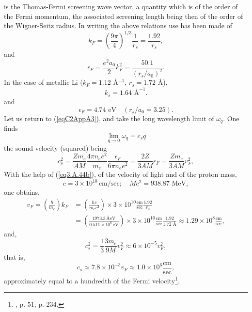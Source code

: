 is the Thomas-Fermi screening wave vector, a quantity which is of the order of the Fermi momentum, the associated screening length being then of the order of the Wigner-Seitz radius. In writing the above relations use has been made of
\begin{equation}\label{eq3.A.44b}
k_F=\left(\frac{9\pi}{4}\right)^{1/3}\frac{1}{r_s}=\frac{1.92}{r_s},
\end{equation}
and
\begin{equation}\label{eq3.A.44}
\epsilon_F=\frac{e^2a_0}{2}k_F^2=\frac{50.1}{(r_s/a_0)^2}.
\end{equation}
 In the case of metallic Li ($k_F=1.12$ \AA$^{-1}$, $r_s=1.72$ \AA),
\begin{equation}\label{eq3.A.45}
k_s=1.64\text{ \AA}^{-1}.
\end{equation}
and
\begin{equation}\label{eq4.8.46}
\epsilon_F=4.74\text{ eV}\quad(r_s/a_0=3.25).
\end{equation}
 Let us return to (\ref{eqC2AppA3}), and take the long wavelength limit of $\omega_q$. One finds
\begin{equation}\label{eq3.A.46}
\lim_{q\to0}\omega_q=c_sq
\end{equation}
 the sound velocity (squared) being 
\begin{equation}\label{eqC2AppA8}
c_s^2=\frac{Zm_e}{AM}\frac{4\pi n_ee^2}{m_e}\frac{\epsilon_F}{6\pi n_e e^2}=\frac{2Z}{3 AM}\epsilon_F=\frac{Zm_e}{3 AM}v_F^2,
\end{equation}
With the help of (\ref{eq3.A.44b}), of the velocity of light and of the proton mass,
\begin{equation}\label{eqC2AppA10}
c=3\times 10^{10}\,\text{cm/sec};\quad Mc^2=938.87\text{ MeV},
\end{equation}
one obtains,
\begin{align}\label{eqC2AppA11}
\nonumber v_F=\left(\frac{\hbar}{m_e}\right)k_F&
=\left(\frac{\hbar c}{m_e c^2}\right)\times 3\times 10^{10}\frac{\text{cm}}{\text{sec}}\frac{1.92}{r_s}\\
&=\left(\frac{1973.3\,\text{\AA eV}}{0.511\times 10^6\,\text{eV}}\right)\times 3\times 10^{10}\frac{\text{cm}}{\text{sec}}\frac{1.92}{1.72\text{ \AA}}
\approx 1.29\times 10^8 \frac{\text{cm}}{\text{sec}},
\end{align}
and,
\begin{equation}\label{eqC2AppA12}
c_s^2=\frac{1}{3}\frac{3m_e}{9M}v_F^2\approx 6\times 10^{-5}v_F^2,
\end{equation}
that is,
\begin{equation}\label{eqC2AppA13}
c_s\approx 7.8\times 10^{-3}v_F\approx 1.0\times 10^6 \frac{\text{cm}}{\text{sec}},
\end{equation}
approximately equal to a hundredth of the Fermi velocity\footnote{\cite{Ashcroft:87}, p. 51, \cite{Ketterson:99} p. 234.}.



